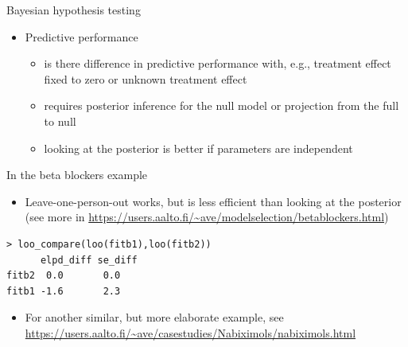 \documentclass[english,t]{beamer}
\begin{document}
\begin{frame}{Bayesian hypothesis testing}

  \begin{itemize}
  \item Predictive performance
    \begin{itemize}
    \item is there difference in predictive performance with, e.g.,
      treatment effect fixed to zero or unknown treatment effect
    \item requires posterior inference for the null model or
      projection from the full to null
    \item looking at the posterior is better if parameters are
      independent
    \end{itemize}
  \end{itemize}

  In the beta blockers example
  \begin{itemize}
  \item Leave-one-person-out works, but is less efficient than looking
    at the posterior (see more in
    \url{https://users.aalto.fi/~ave/modelselection/betablockers.html})
  \end{itemize}

\begin{verbatim}
> loo_compare(loo(fitb1),loo(fitb2))
      elpd_diff se_diff
fitb2  0.0       0.0   
fitb1 -1.6       2.3   
\end{verbatim}
  \pause
  \begin{itemize}
  \item For another similar, but more elaborate example, see \url{https://users.aalto.fi/~ave/casestudies/Nabiximols/nabiximols.html}
  \end{itemize}
\end{frame}


  
  
\end{document}
